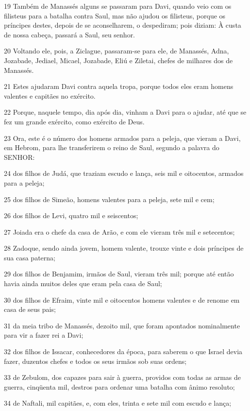 \par 19 Também de Manassés alguns se passaram para Davi, quando veio com os filisteus para a batalha contra Saul, mas não ajudou os filisteus, porque os príncipes destes, depois de se aconselharem, o despediram; pois diziam: À custa de nossa cabeça, passará a Saul, seu senhor.
\par 20 Voltando ele, pois, a Ziclague, passaram-se para ele, de Manassés, Adna, Jozabade, Jediael, Micael, Jozabade, Eliú e Ziletai, chefes de milhares dos de Manassés.
\par 21 Estes ajudaram Davi contra aquela tropa, porque todos eles eram homens valentes e capitães no exército.
\par 22 Porque, naquele tempo, dia após dia, vinham a Davi para o ajudar, até que se fez um grande exército, como exército de Deus.
\par 23 Ora, este é o número dos homens armados para a peleja, que vieram a Davi, em Hebrom, para lhe transferirem o reino de Saul, segundo a palavra do SENHOR:
\par 24 dos filhos de Judá, que traziam escudo e lança, seis mil e oitocentos, armados para a peleja;
\par 25 dos filhos de Simeão, homens valentes para a peleja, sete mil e cem;
\par 26 dos filhos de Levi, quatro mil e seiscentos;
\par 27 Joiada era o chefe da casa de Arão, e com ele vieram três mil e setecentos;
\par 28 Zadoque, sendo ainda jovem, homem valente, trouxe vinte e dois príncipes de sua casa paterna;
\par 29 dos filhos de Benjamim, irmãos de Saul, vieram três mil; porque até então havia ainda muitos deles que eram pela casa de Saul;
\par 30 dos filhos de Efraim, vinte mil e oitocentos homens valentes e de renome em casa de seus pais;
\par 31 da meia tribo de Manassés, dezoito mil, que foram apontados nominalmente para vir a fazer rei a Davi;
\par 32 dos filhos de Issacar, conhecedores da época, para saberem o que Israel devia fazer, duzentos chefes e todos os seus irmãos sob suas ordens;
\par 33 de Zebulom, dos capazes para sair à guerra, providos com todas as armas de guerra, cinqüenta mil, destros para ordenar uma batalha com ânimo resoluto;
\par 34 de Naftali, mil capitães, e, com eles, trinta e sete mil com escudo e lança;
